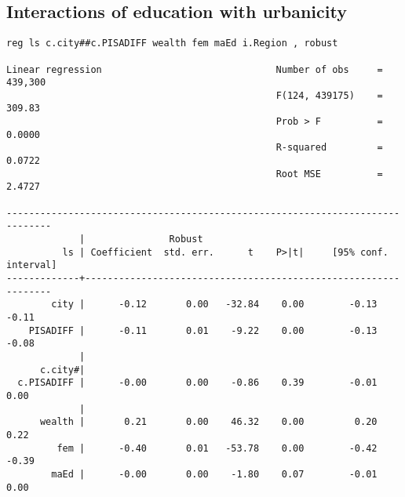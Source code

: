 \documentclass[11pt, letterpaper]{article}
\begin{document}
\begin{spacing}{1.9}




\section{Interactions of education with urbanicity}

\begin{spacing}{.9}
\begin{scriptsize}
\begin{verbatim}
reg ls c.city##c.PISADIFF wealth fem maEd i.Region , robust

Linear regression                               Number of obs     =    439,300
                                                F(124, 439175)    =     309.83
                                                Prob > F          =     0.0000
                                                R-squared         =     0.0722
                                                Root MSE          =     2.4727

------------------------------------------------------------------------------
             |               Robust
          ls | Coefficient  std. err.      t    P>|t|     [95% conf. interval]
-------------+----------------------------------------------------------------
        city |      -0.12       0.00   -32.84    0.00        -0.13       -0.11
    PISADIFF |      -0.11       0.01    -9.22    0.00        -0.13       -0.08
             |
      c.city#|
  c.PISADIFF |      -0.00       0.00    -0.86    0.39        -0.01        0.00
             |
      wealth |       0.21       0.00    46.32    0.00         0.20        0.22
         fem |      -0.40       0.01   -53.78    0.00        -0.42       -0.39
        maEd |      -0.00       0.00    -1.80    0.07        -0.01        0.00


\end{verbatim}
\end{scriptsize}
\end{spacing}
\end{spacing}
\end{document}
